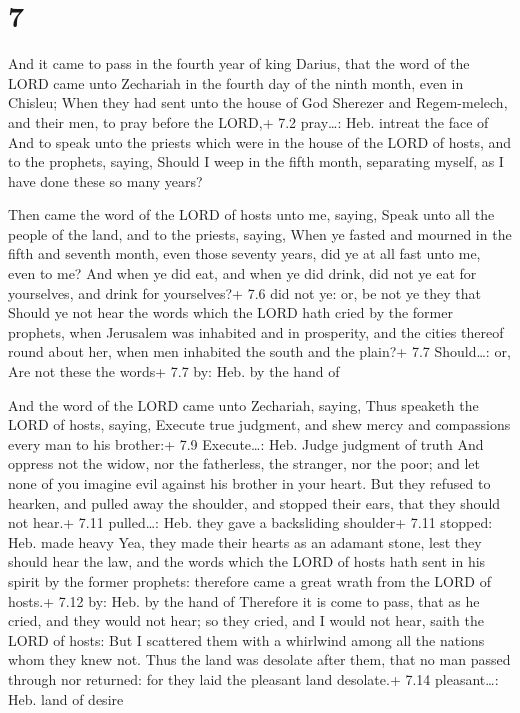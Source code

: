 \hypertarget{section-6}{%
\section{7}\label{section-6}}

 And it came to pass in the fourth year of king Darius, that
the word of the LORD came unto Zechariah in the fourth day of the ninth
month, even in Chisleu;  When they had sent unto the house
of God Sherezer and Regem-melech, and their men, to pray before the
LORD,+ 7.2 pray\ldots: Heb. intreat the face of  And to
speak unto the priests which were in the house of the LORD of hosts, and
to the prophets, saying, Should I weep in the fifth month, separating
myself, as I have done these so many years?

 Then came the word of the LORD of hosts unto me, saying,
 Speak unto all the people of the land, and to the priests,
saying, When ye fasted and mourned in the fifth and seventh month, even
those seventy years, did ye at all fast unto me, even to me?
 And when ye did eat, and when ye did drink, did not ye eat
for yourselves, and drink for yourselves?+ 7.6 did not ye: or, be not ye
they that  Should ye not hear the words which the LORD hath
cried by the former prophets, when Jerusalem was inhabited and in
prosperity, and the cities thereof round about her, when men inhabited
the south and the plain?+ 7.7 Should\ldots: or, Are not these the words+
7.7 by: Heb. by the hand of

 And the word of the LORD came unto Zechariah, saying,
 Thus speaketh the LORD of hosts, saying, Execute true
judgment, and shew mercy and compassions every man to his brother:+ 7.9
Execute\ldots: Heb. Judge judgment of truth  And oppress
not the widow, nor the fatherless, the stranger, nor the poor; and let
none of you imagine evil against his brother in your heart.
 But they refused to hearken, and pulled away the shoulder,
and stopped their ears, that they should not hear.+ 7.11 pulled\ldots:
Heb. they gave a backsliding shoulder+ 7.11 stopped: Heb. made heavy
 Yea, they made their hearts as an adamant stone, lest they
should hear the law, and the words which the LORD of hosts hath sent in
his spirit by the former prophets: therefore came a great wrath from the
LORD of hosts.+ 7.12 by: Heb. by the hand of  Therefore it
is come to pass, that as he cried, and they would not hear; so they
cried, and I would not hear, saith the LORD of hosts:  But
I scattered them with a whirlwind among all the nations whom they knew
not. Thus the land was desolate after them, that no man passed through
nor returned: for they laid the pleasant land desolate.+ 7.14
pleasant\ldots: Heb. land of desire

